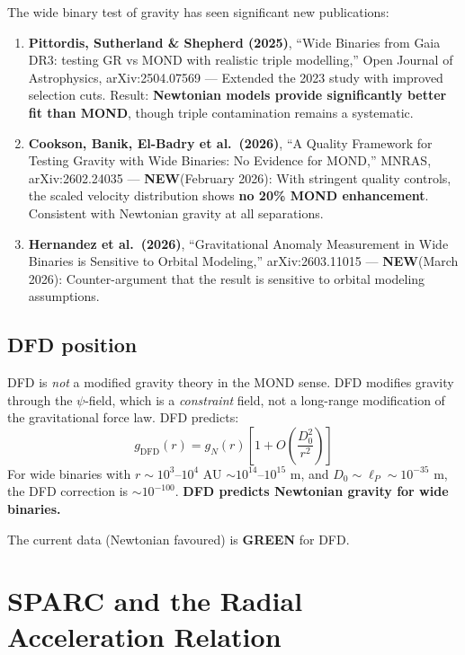 \documentclass[11pt,a4paper]{article}
\newcommand{\GREEN}{\textcolor{dfdgreen}{\textbf{GREEN}}}
\newcommand{\NEW}{\textcolor{dfdblue}{\textbf{NEW}}}
\begin{document}
The wide binary test of gravity has seen significant new publications:

\begin{enumerate}
\item \textbf{Pittordis, Sutherland \& Shepherd (2025)}, ``Wide Binaries from Gaia DR3: testing GR vs MOND with realistic triple modelling,'' Open Journal of Astrophysics, arXiv:2504.07569 --- Extended the 2023 study with improved selection cuts. Result: \textbf{Newtonian models provide significantly better fit than MOND}, though triple contamination remains a systematic.

\item \textbf{Cookson, Banik, El-Badry et al.\ (2026)}, ``A Quality Framework for Testing Gravity with Wide Binaries: No Evidence for MOND,'' MNRAS, arXiv:2602.24035 --- \NEW (February 2026): With stringent quality controls, the scaled velocity distribution shows \textbf{no 20\% MOND enhancement}. Consistent with Newtonian gravity at all separations.

\item \textbf{Hernandez et al.\ (2026)}, ``Gravitational Anomaly Measurement in Wide Binaries is Sensitive to Orbital Modeling,'' arXiv:2603.11015 --- \NEW (March 2026): Counter-argument that the result is sensitive to orbital modeling assumptions.
\end{enumerate}

\subsection{DFD position}

DFD is \emph{not} a modified gravity theory in the MOND sense. DFD modifies gravity through the $\psi$-field, which is a \emph{constraint} field, not a long-range modification of the gravitational force law. DFD predicts:
\begin{equation}
g_{\text{DFD}}(r) = g_N(r)\left[1 + O\left(\frac{D_0^2}{r^2}\right)\right]
\end{equation}
For wide binaries with $r \sim 10^3$--$10^4$ AU $\sim 10^{14}$--$10^{15}$ m, and $D_0 \sim \ell_P \sim 10^{-35}$ m, the DFD correction is $\sim 10^{-100}$. \textbf{DFD predicts Newtonian gravity for wide binaries.}

The current data (Newtonian favoured) is \GREEN{} for DFD.

\section{SPARC and the Radial Acceleration Relation}
\end{document}
